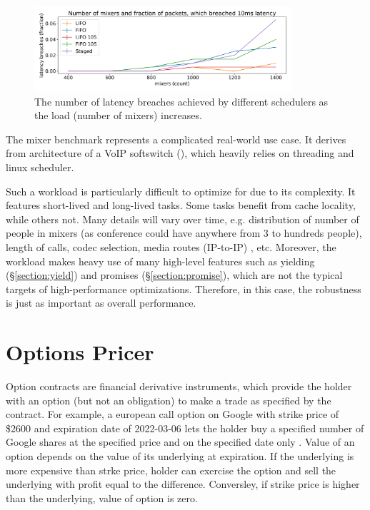 \documentclass[12pt,a4paper,twoside]{report}
\begin{document}
\begin{figure} 
    \centering 
    \includegraphics[width=0.85\textwidth]{eval/mixer-base8.png}
    \caption{The number of latency breaches achieved by different schedulers as the load (number of mixers) increases.}
   \label{fig:mixer-bench}
\end{figure}

The mixer benchmark represents a complicated real-world use case. It derives from architecture of a VoIP softswitch (\cite{Maruzzelli2017-ou}), which heavily relies on threading and linux scheduler. 

Such a workload is particularly difficult to optimize for due to its complexity. It features short-lived and long-lived tasks. Some tasks benefit from cache locality, while others not. Many details will vary over time, e.g. distribution of number of people in mixers (as conference could have anywhere from 3 to hundreds people), length of calls, codec selection, media routes (IP-to-IP) \cite{Frequent1:online}, etc. Moreover, the workload makes heavy use of many high-level features such as yielding (\S\ref{section:yield}) and promises (\S\ref{section:promise}), which are not the typical targets of high-performance optimizations. Therefore, in this case, the robustness is just as important as overall performance. 


\label{paragraph:overflow-queue-bad-2}

\section{Options Pricer}
Option contracts are financial derivative instruments, which provide the holder with an option (but not an obligation) to make a trade as specified by the contract. For example, a european call option on Google with strike price of \$2600 and expiration date of 2022-03-06 lets the holder buy a specified number of Google shares at the specified price and on the specified date only \cite{Hull_John}. Value of an option depends on the value of its underlying at expiration. If the underlying is more expensive than strke price, holder can exercise the option and sell the underlying with profit equal to the difference. Conversley, if strike price is higher than the underlying, value of option is zero.  
\end{document}
